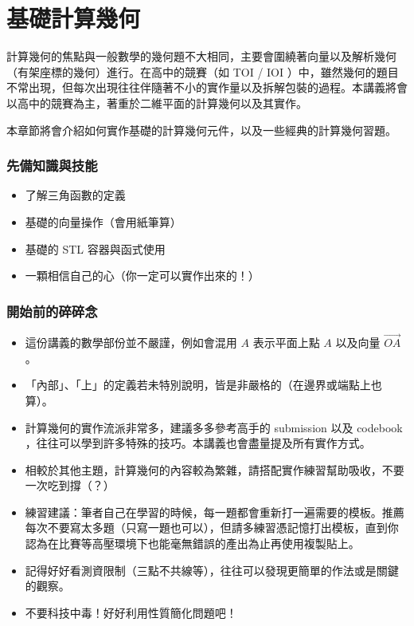 \documentclass[main.tex]{subfiles}
\begin{document}
\chapter{基礎計算幾何}

計算幾何的焦點與一般數學的幾何題不大相同，主要會圍繞著向量以及解析幾何（有架座標的幾何）進行。在高中的競賽（如 TOI / IOI ）中，雖然幾何的題目不常出現，但每次出現往往伴隨著不小的實作量以及拆解包裝的過程。本講義將會以高中的競賽為主，著重於二維平面的計算幾何以及其實作。

本章節將會介紹如何實作基礎的計算幾何元件，以及一些經典的計算幾何習題。

\subsection{先備知識與技能}

\begin{itemize}
	\item 了解三角函數的定義
	\item 基礎的向量操作（會用紙筆算）
	\item 基礎的 STL 容器與函式使用
	\item 一顆相信自己的心（你一定可以實作出來的！）
\end{itemize}

\subsection{開始前的碎碎念}

\begin{itemize}
	\item 這份講義的數學部份並不嚴謹，例如會混用 $A$ 表示平面上點 $A$ 以及向量 $\vec{OA}$ 。
	\item 「內部」、「上」的定義若未特別說明，皆是非嚴格的（在邊界或端點上也算）。
	\item 計算幾何的實作流派非常多，建議多多參考高手的 submission 以及 codebook ，往往可以學到許多特殊的技巧。本講義也會盡量提及所有實作方式。
	\item 相較於其他主題，計算幾何的內容較為繁雜，請搭配實作練習幫助吸收，不要一次吃到撐（？）
	\item 練習建議：筆者自己在學習的時候，每一題都會重新打一遍需要的模板。推薦每次不要寫太多題（只寫一題也可以），但請多練習憑記憶打出模板，直到你認為在比賽等高壓環境下也能毫無錯誤的產出為止再使用複製貼上。
	\item 記得好好看測資限制（三點不共線等），往往可以發現更簡單的作法或是關鍵的觀察。
	\item 不要科技中毒！好好利用性質簡化問題吧！
\end{itemize}
\end{document}

